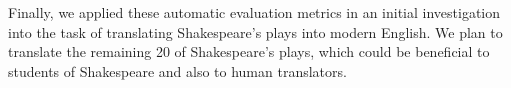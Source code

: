 \documentclass[10pt,a5paper,twoside]{article}
\begin{document}
Finally, we applied these automatic evaluation metrics in an initial investigation into the task of translating Shakespeare's plays into modern English.
We plan to translate the remaining 20 of Shakespeare's plays, which could be beneficial to students
of Shakespeare and also to human translators.




\end{document}
